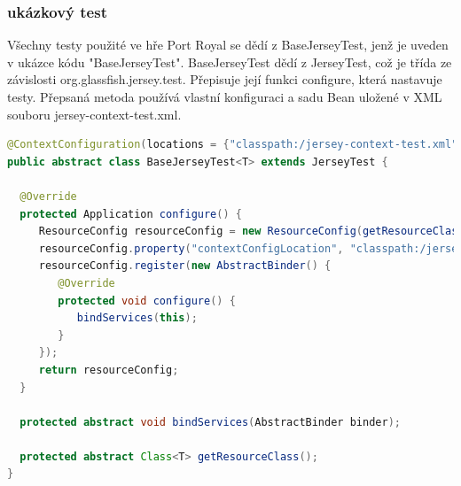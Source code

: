 \documentclass[czech,master,public,dept460,male,cpdeclaration,twoside]{diploma}
\begin{document}
\subsubsection{ukázkový test}
Všechny testy použité ve hře Port Royal se dědí z BaseJerseyTest, jenž je uveden v ukázce kódu "BaseJerseyTest". BaseJerseyTest dědí z JerseyTest, což je třída ze závislosti org.glassfish.jersey.test. Přepisuje její funkci configure, která nastavuje testy. Přepsaná metoda používá vlastní  konfiguraci a sadu Bean uložené v XML souboru jersey-context-test.xml.
\\
\begin{lstlisting}[language=Java, caption=BaseJerseyTest]
@ContextConfiguration(locations = {"classpath:/jersey-context-test.xml"})
public abstract class BaseJerseyTest<T> extends JerseyTest {

  @Override
  protected Application configure() {
     ResourceConfig resourceConfig = new ResourceConfig(getResourceClass());
     resourceConfig.property("contextConfigLocation", "classpath:/jersey-context-test.xml");
     resourceConfig.register(new AbstractBinder() {
        @Override
        protected void configure() {
           bindServices(this);
        }
     });
     return resourceConfig;
  }
  
  protected abstract void bindServices(AbstractBinder binder);

  protected abstract Class<T> getResourceClass();
}
\end{lstlisting}
\end{document}
